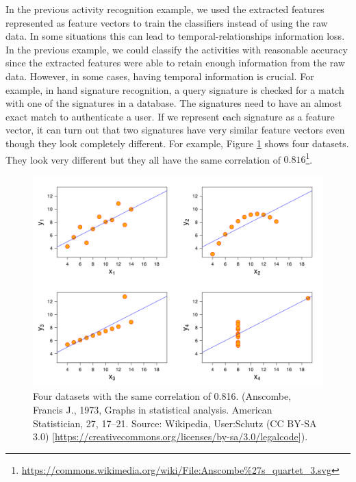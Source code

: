 \documentclass[
  11pt,
]{krantz}
\begin{document}
In the previous activity recognition example, we used the extracted features represented as feature vectors to train the classifiers instead of using the raw data. In some situations this can lead to temporal-relationships information loss. In the previous example, we could classify the activities with reasonable accuracy since the extracted features were able to retain enough information from the raw data. However, in some cases, having temporal information is crucial. For example, in hand signature recognition, a query signature is checked for a match with one of the signatures in a database. The signatures need to have an almost exact match to authenticate a user. If we represent each signature as a feature vector, it can turn out that two signatures have very similar feature vectors even though they look completely different. For example, Figure \ref{fig:correlations} shows four datasets. They look very different but they all have the same correlation of \(0.816\)\footnote{\url{https://commons.wikimedia.org/wiki/File:Anscombe\%27s_quartet_3.svg}}.



\begin{figure}

{\centering \includegraphics[width=0.9\linewidth]{images/correlations} 

}

\caption{Four datasets with the same correlation of 0.816. (Anscombe, Francis J., 1973, Graphs in statistical analysis. American Statistician, 27, 17--21. Source: Wikipedia, User:Schutz (CC BY-SA 3.0) {[}\url{https://creativecommons.org/licenses/by-sa/3.0/legalcode}{]}).}\label{fig:correlations}
\end{figure}
\end{document}
